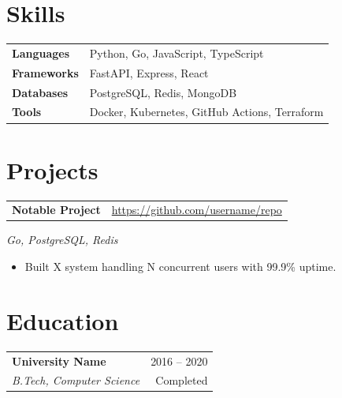 \documentclass[10pt, a4paper]{article}
\makeatletter
\newcommand{\eduentry}[4]{%
  \noindent
  \begin{tabularx}{\linewidth}{@{}X r@{}}
    \textbf{#1} & \textcolor{subtle}{\small #4} \\
    \textit{\small #2} & \textcolor{subtle}{\small #3}
  \end{tabularx}
  \vspace{4pt}
}
\newcommand{\projectentry}[4]{%
  \noindent
  \begin{tabularx}{\linewidth}{@{}X r@{}}
    \textbf{#1} & \href{#3}{\textcolor{subtle}{\small #3}}
  \end{tabularx}
  \vspace{1pt}
  \textcolor{subtle}{\small \textit{#2}}
  \vspace{1pt}
  #4
  \vspace{6pt}
}
\makeatother
\begin{document}
\section{Skills}
\noindent
\begin{tabularx}{\linewidth}{@{} l X @{}}
  \textbf{Languages}   & Python, Go, JavaScript, TypeScript \\[2pt]
  \textbf{Frameworks}  & FastAPI, Express, React \\[2pt]
  \textbf{Databases}   & PostgreSQL, Redis, MongoDB \\[2pt]
  \textbf{Tools}       & Docker, Kubernetes, GitHub Actions, Terraform \\
\end{tabularx}

\section{Projects}
\projectentry{Notable Project}{Go, PostgreSQL, Redis}{https://github.com/username/repo}{%
  \begin{itemize}
    \item Built X system handling N concurrent users with 99.9\% uptime.
  \end{itemize}
}

\section{Education}
\eduentry{University Name}{B.Tech, Computer Science}{Completed}{2016 -- 2020}

\end{document}
